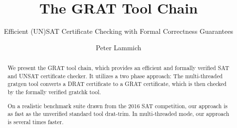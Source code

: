 \documentclass{llncs}
\begin{document}
\title{The GRAT Tool Chain}
\subtitle{Efficient (UN)SAT Certificate Checking with Formal Correctness Guarantees}

\author{Peter Lammich}


\maketitle

\begin{abstract}
We present the GRAT tool chain, which provides an efficient and formally verified SAT and UNSAT certificate checker.
It utilizes a two phase approach: The multi-threaded gratgen tool converts a DRAT certificate to a GRAT certificate, which is then
checked by the formally verified gratchk tool. 

On a realistic benchmark suite drawn from the 2016 SAT competition,
our approach is as fast as the unverified standard tool drat-trim. In multi-threaded mode, our approach is several times faster.
\end{abstract}

% 
% 
\end{document}
